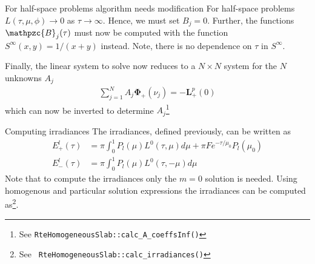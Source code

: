 \documentclass[14]{beamer}
\newcommand{\mvec}[1]{\mathbf{#1}}
\newcommand{\gvec}[1]{\boldsymbol{#1}}
\newcommand{\script}[1]{\mathpzc{#1}}
\begin{document}
\begin{frame}{For half-space problems algorithm needs modification}
  For half-space problems $L(\tau,\mu,\phi) \rightarrow 0$ as $\tau
  \rightarrow \infty$. Hence, we must set $B_j = 0$. Further, the
  functions $\script{B}_j(\tau)$ must now be computed with the
  function $S^\infty(x,y) = 1/(x+y)$ instead. Note, there is no
  dependence on $\tau$ in $S^\infty$.

  Finally, the linear system to solve now reduces to a $N\times N$
  system for the $N$ unknowns $A_j$
  \begin{align}
    \sum_{j=1}^N
      A_j \gvec{\Phi}_+(\nu_j) = -\mvec{L}_+^p(0)
  \end{align}
  which can now be inverted to determine $A_j$\footnote{See
    {\tt RteHomogeneousSlab::calc\_A\_coeffsInf()}}
\end{frame}

\begin{frame}{Computing irradiances}
  The irradiances, defined previously, can be written as
  \begin{align}
    E_+^l(\tau) &= \pi \int_0^1
     P_l(\mu) L^0(\tau,\mu) d\mu
    + \pi F e^{-\tau/\mu_0} P_l(\mu_0) \\
    E_-^l(\tau) &= \pi \int_0^1
    P_l(\mu) L^0(\tau,-\mu) d\mu
  \end{align}
  Note that to compute the irradiances only the $m=0$ solution is
  needed. Using homogenous and particular solution expressions the
  irradiances can be computed as\footnote{See {\tt
      RteHomogeneousSlab::calc\_irradiances()}}.
\end{frame}
\end{document}
